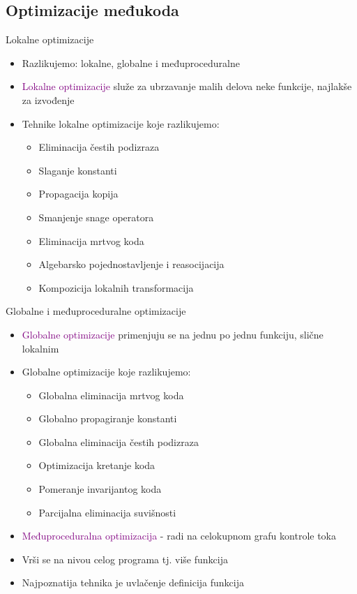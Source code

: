 \documentclass[compress, containsverbatim,mathserif, xcolor=dvipsnames, unicode]{beamer}
\begin{document}
\subsection{Optimizacije međukoda}
\begin{frame}{Lokalne optimizacije}
    
    \begin{itemize}
        \item Razlikujemo: lokalne, globalne i međuproceduralne
        \item  \textcolor{purple}{Lokalne optimizacije} služe za ubrzavanje malih delova neke funkcije, najlakše za izvođenje
        \item Tehnike lokalne optimizacije koje razlikujemo: 
                \begin{itemize}
                    \item Eliminacija čestih podizraza
                    \item Slaganje konstanti
                    \item Propagacija kopija
                    \item Smanjenje snage operatora
                    \item Eliminacija mrtvog koda
                    \item Algebarsko pojednostavljenje i reasocijacija
                    \item Kompozicija lokalnih transformacija
                \end{itemize}
        \end{itemize}
\end{frame}


\begin{frame}{Globalne i međuproceduralne optimizacije}
    \begin{itemize}
        \item \textcolor{purple}{Globalne optimizacije} primenjuju se na jednu po jednu funkciju, slične lokalnim
        \item Globalne optimizacije koje razlikujemo: 
                \begin{itemize}
                    \item Globalna eliminacija mrtvog koda
                    \item Globalno propagiranje konstanti
                    \item Globalna eliminacija čestih podizraza
                    \item Optimizacija kretanje koda
                    \item Pomeranje invarijantog koda
                    \item Parcijalna eliminacija suvišnosti
                \end{itemize}
        \item \textcolor{purple}{Međuproceduralna optimizacija } - radi na celokupnom grafu kontrole toka
        \item Vrši se na nivou celog programa tj. više funkcija 
        \item Najpoznatija tehnika je uvlačenje definicija funkcija 
        \end{itemize}
\end{frame}
\end{document}
